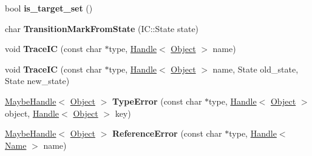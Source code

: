 \begin{DoxyCompactItemize}
\item 
\hypertarget{classv8_1_1internal_1_1_i_c_a432ad23b10baf0f2d407ee3b691cba02}{}bool {\bfseries is\+\_\+target\+\_\+set} ()\label{classv8_1_1internal_1_1_i_c_a432ad23b10baf0f2d407ee3b691cba02}

\item 
\hypertarget{classv8_1_1internal_1_1_i_c_ac4072f911634765d5b5777c71b9dd68a}{}char {\bfseries Transition\+Mark\+From\+State} (I\+C\+::\+State state)\label{classv8_1_1internal_1_1_i_c_ac4072f911634765d5b5777c71b9dd68a}

\item 
\hypertarget{classv8_1_1internal_1_1_i_c_af37837a5140c88c3179a970e690e091e}{}void {\bfseries Trace\+I\+C} (const char $\ast$type, \hyperlink{classv8_1_1internal_1_1_handle}{Handle}$<$ \hyperlink{classv8_1_1internal_1_1_object}{Object} $>$ name)\label{classv8_1_1internal_1_1_i_c_af37837a5140c88c3179a970e690e091e}

\item 
\hypertarget{classv8_1_1internal_1_1_i_c_a8576e14981ac1ce2ae476299799eb694}{}void {\bfseries Trace\+I\+C} (const char $\ast$type, \hyperlink{classv8_1_1internal_1_1_handle}{Handle}$<$ \hyperlink{classv8_1_1internal_1_1_object}{Object} $>$ name, State old\+\_\+state, State new\+\_\+state)\label{classv8_1_1internal_1_1_i_c_a8576e14981ac1ce2ae476299799eb694}

\item 
\hypertarget{classv8_1_1internal_1_1_i_c_a0e54123bf945632a0e3d037e1c5048cd}{}\hyperlink{classv8_1_1internal_1_1_maybe_handle}{Maybe\+Handle}$<$ \hyperlink{classv8_1_1internal_1_1_object}{Object} $>$ {\bfseries Type\+Error} (const char $\ast$type, \hyperlink{classv8_1_1internal_1_1_handle}{Handle}$<$ \hyperlink{classv8_1_1internal_1_1_object}{Object} $>$ object, \hyperlink{classv8_1_1internal_1_1_handle}{Handle}$<$ \hyperlink{classv8_1_1internal_1_1_object}{Object} $>$ key)\label{classv8_1_1internal_1_1_i_c_a0e54123bf945632a0e3d037e1c5048cd}

\item 
\hypertarget{classv8_1_1internal_1_1_i_c_a626771ce5538351653f530ffc624599d}{}\hyperlink{classv8_1_1internal_1_1_maybe_handle}{Maybe\+Handle}$<$ \hyperlink{classv8_1_1internal_1_1_object}{Object} $>$ {\bfseries Reference\+Error} (const char $\ast$type, \hyperlink{classv8_1_1internal_1_1_handle}{Handle}$<$ \hyperlink{classv8_1_1internal_1_1_name}{Name} $>$ name)\label{classv8_1_1internal_1_1_i_c_a626771ce5538351653f530ffc624599d}


\end{DoxyCompactItemize}
